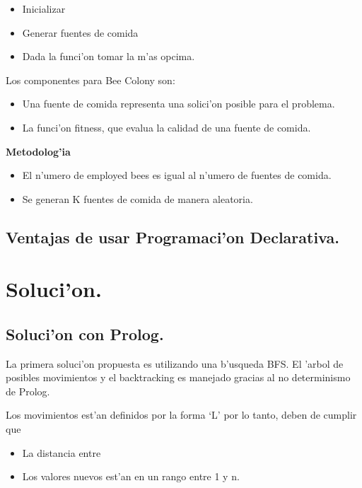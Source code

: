 \documentclass[12pt]{article}
\begin{document}
    \begin{itemize}
        \item Inicializar
        \item Generar fuentes de comida
        \item Dada la funci'on tomar la m'as opcima.
    \end{itemize}
    \vspace{4mm}

    Los componentes para Bee Colony son:
    \begin{itemize}
        \item Una fuente de comida representa una solici'on posible para el problema.
        \item La funci'on fitness, que evalua la calidad de una fuente de comida.
    \end{itemize}

    \textbf{Metodolog'ia}
    \begin{itemize}
        \item El n'umero de employed bees es igual al n'umero de fuentes de comida.
        \item Se generan K fuentes de comida de manera aleatoria.
    \end{itemize}


    \subsection{Ventajas de usar Programaci'on Declarativa.}

    \section{Soluci'on.}

    \subsection{Soluci'on con Prolog.}
    La primera soluci'on propuesta es utilizando una b'usqueda BFS.
    El 'arbol de posibles movimientos y el backtracking es manejado
    gracias al no determinismo de Prolog.

    Los movimientos est'an definidos por la forma `L' \; por lo tanto, deben de cumplir
    que
    \begin{itemize}
        \item La distancia entre
        \item Los valores nuevos est'an en un rango entre 1 y n.
    \end{itemize}
\end{document}
